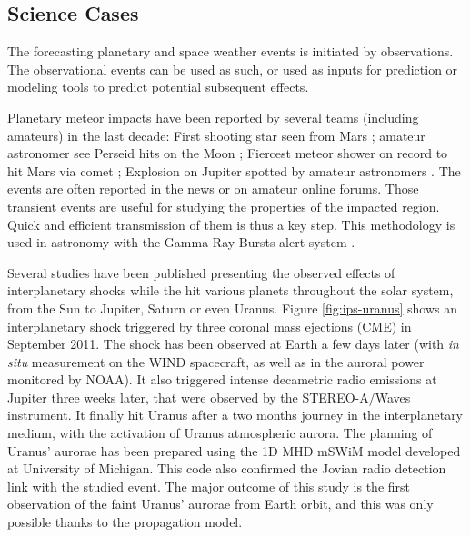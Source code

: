 \documentclass[referee,a4paper,12pt,traditabstract]{swsc}
\begin{document}
\begin{linenumbers}
\section{Science Cases}
The forecasting planetary and space weather events is initiated by observations. The observational events can be used as such, or used as inputs for prediction or modeling tools to predict potential subsequent effects. 

Planetary meteor impacts have been reported by several teams (including amateurs) in the last decade: First shooting star seen from Mars \citep{Selsis05}; amateur astronomer see Perseid hits on the Moon \citep{Spellman08}; Fiercest meteor shower on record to hit Mars via comet \cite{Grossman13}; Explosion on Jupiter spotted by amateur astronomers \citep{Malik12}. The events are often reported in the news or on amateur online forums. Those transient events are useful for studying the properties of the impacted region. Quick and efficient transmission of them is thus a key step. This methodology is used in astronomy with the Gamma-Ray Bursts alert system \citep{barthelmy08}. 

Several studies have been published \citep{prange04,Lamy12} presenting the observed effects of interplanetary shocks while the hit various planets throughout the solar system, from the Sun to Jupiter, Saturn or even Uranus. Figure \ref{fig:ips-uranus} shows an interplanetary shock triggered by three coronal mass ejections (CME) in September 2011. The shock has been observed at Earth a few days later (with {\it in situ} measurement on the WIND spacecraft, as well as in the auroral power monitored by NOAA). It also triggered intense decametric radio emissions at Jupiter three weeks later, that were observed by the STEREO-A/Waves instrument. It finally hit Uranus after a two months journey in the interplanetary medium, with the activation of Uranus atmospheric aurora. The planning of Uranus' aurorae has been prepared using the 1D MHD mSWiM model \citep{zieger08} developed at University of Michigan. This code also confirmed the Jovian radio detection link with the studied event. The major outcome of this study is the first observation of the faint Uranus' aurorae from Earth orbit, and this was only possible thanks to the propagation model.


\end{linenumbers}
\end{document}
